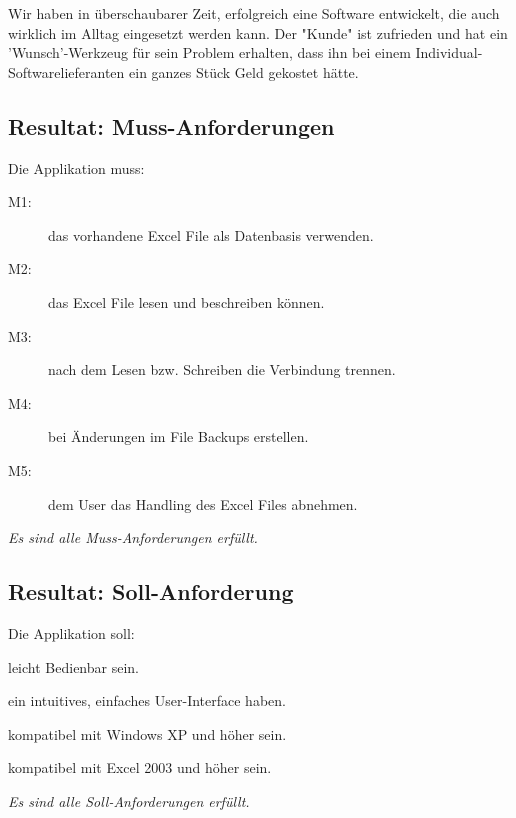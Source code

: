 \documentclass{article}
\begin{document}
Wir haben in überschaubarer Zeit, erfolgreich eine Software entwickelt, die auch wirklich im Alltag eingesetzt werden kann. Der "Kunde" ist zufrieden und hat ein 'Wunsch'-Werkzeug für sein Problem erhalten, dass ihn bei einem Individual-Softwarelieferanten ein ganzes Stück Geld gekostet hätte.

\subsection{Resultat: Muss-Anforderungen}
Die Applikation muss:
	\begin{description}
		\item[M1:] das vorhandene Excel File als Datenbasis verwenden. \color{green} {}
		\color{black}\item[M2:] das Excel File lesen und beschreiben können. \color{green} {}
		\color{black}\item[M3:] nach dem Lesen bzw. Schreiben die Verbindung trennen. \color{green} {}
		\color{black}\item[M4:] bei Änderungen im File Backups erstellen. \color{green} {}
		\color{black}\item[M5:] dem User das Handling des Excel Files abnehmen. \color{green} {}
	\end{description}
\vspace{5mm}
\textit{Es sind alle Muss-Anforderungen erfüllt.}

\subsection{Resultat: Soll-Anforderung}
Die Applikation soll:
\begin{description}
	\color{black}\item[S1:] leicht Bedienbar sein. \color{green} {}
	\color{black}\item[S2:] ein intuitives, einfaches User-Interface haben. \color{green} {}
	\color{black}\item[S3:] kompatibel mit Windows XP und höher sein. \color{green} {}
	\color{black}\item[S4:] kompatibel mit Excel 2003 und höher sein. \color{green} {}
\end{description}
\vspace{5mm}
\textit{Es sind alle Soll-Anforderungen erfüllt.}
\end{document}
